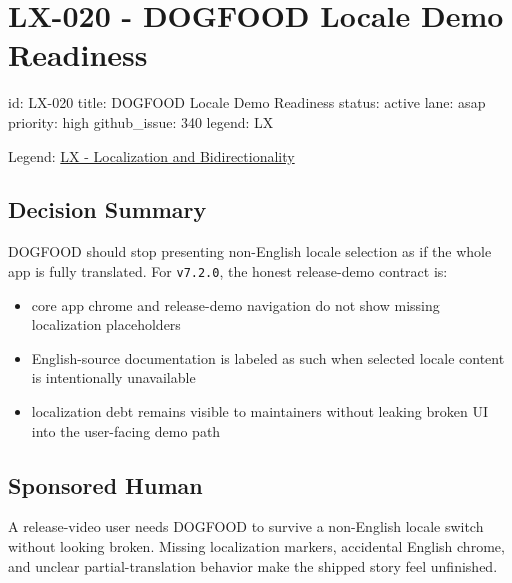 \chapter{LX-020 - DOGFOOD Locale Demo Readiness}\label{record-196}

\smallskip

\begin{RecordMeta}
id: LX-020
title: DOGFOOD Locale Demo Readiness
status: active
lane: asap
priority: high
github_issue: 340
legend: LX

\end{RecordMeta}

Legend: \href{https://github.com/flyingrobots/bijou/blob/1853ad902f6bf219326409e7f743a5a1d6517dbc/docs/legends/LX-localization-and-bidirectionality.md}{LX - Localization and Bidirectionality}

\section{Decision Summary}\label{record-196-decision-summary}

DOGFOOD should stop presenting non-English locale selection as if the whole app is fully translated. For \texttt{v\allowbreak{}7\allowbreak{}.\allowbreak{}2\allowbreak{}.\allowbreak{}0}, the honest release-demo contract is:

\begin{itemize}
\tightlist
\item
  core app chrome and release-demo navigation do not show missing localization placeholders
\item
  English-source documentation is labeled as such when selected locale content is intentionally unavailable
\item
  localization debt remains visible to maintainers without leaking broken UI into the user-facing demo path
\end{itemize}

\section{Sponsored Human}\label{record-196-sponsored-human}

A release-video user needs DOGFOOD to survive a non-English locale switch without looking broken. Missing localization markers, accidental English chrome, and unclear partial-translation behavior make the shipped story feel unfinished.

